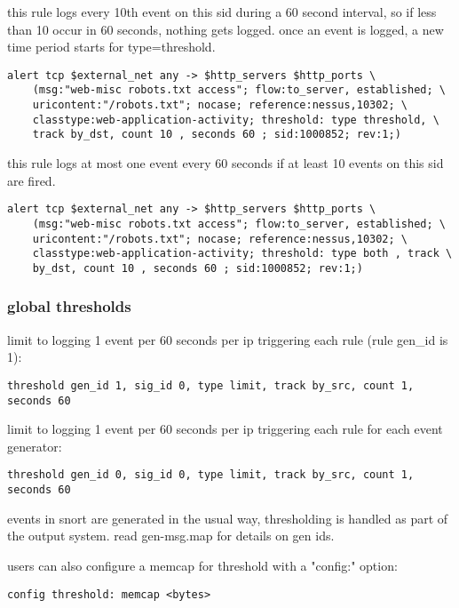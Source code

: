 \documentclass[english]{report}
\begin{document}
this rule logs every 10th event on this sid during a 60 second interval, so if
less than 10 occur in 60 seconds, nothing gets logged.  once an event is
logged, a new time period starts for type=threshold.

\begin{verbatim}
alert tcp $external_net any -> $http_servers $http_ports \
    (msg:"web-misc robots.txt access"; flow:to_server, established; \
    uricontent:"/robots.txt"; nocase; reference:nessus,10302; \
    classtype:web-application-activity; threshold: type threshold, \
    track by_dst, count 10 , seconds 60 ; sid:1000852; rev:1;)
\end{verbatim}


this rule logs at most one event every 60 seconds if at least 10 events on this sid are fired.

\begin{verbatim}
alert tcp $external_net any -> $http_servers $http_ports \
    (msg:"web-misc robots.txt access"; flow:to_server, established; \
    uricontent:"/robots.txt"; nocase; reference:nessus,10302; \
    classtype:web-application-activity; threshold: type both , track \
    by_dst, count 10 , seconds 60 ; sid:1000852; rev:1;)
\end{verbatim}

\subsubsection{global thresholds}

limit to logging 1 event per 60 seconds per ip triggering each rule (rule gen\_id is 1):
\begin{verbatim}
threshold gen_id 1, sig_id 0, type limit, track by_src, count 1, seconds 60
\end{verbatim}

limit to logging 1 event per 60 seconds per ip triggering each rule for each event generator:
\begin{verbatim}
threshold gen_id 0, sig_id 0, type limit, track by_src, count 1, seconds 60
\end{verbatim}

events in snort are generated in the usual way, thresholding is handled as part
of the output system. read gen-msg.map for details on gen ids.

users can also configure a memcap for threshold with a "config:" option:

\begin{verbatim}
config threshold: memcap <bytes>
\end{verbatim}
\end{document}

